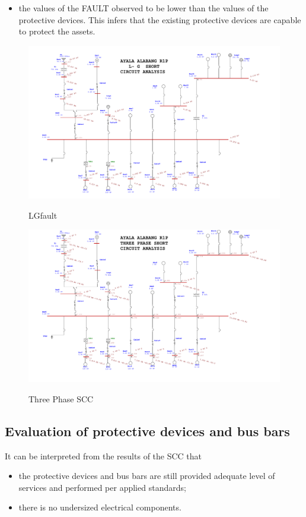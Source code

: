 \begin{itemize}
\item the values of the FAULT observed to be lower than the values of the protective devices. This infers that the existing protective devices are capable to protect the assets.
\end{itemize}

\begin{figure}
%	
	\includegraphics[width=\textwidth]{figures/R1P_LG_short_circuit.pdf} \\
	\caption{LGfault}
	\label{fig_ch04_elecaudit_scc_lgfault} 
\end{figure}

\begin{figure}
	\includegraphics[width=\textwidth]{figures/R1P_3Pshortcircuit.pdf} \\
	\caption{Three Phase SCC}
	\label{fig_ch04_elecaudit_scc_3phase} 
\end{figure}

\subsection{Evaluation of protective devices and bus bars}
It can be interpreted from the results of the SCC that 
\begin{itemize}
\item the protective devices and bus bars are still provided adequate level of services and performed per applied standards;

\item there is no undersized electrical components.
\end{itemize}